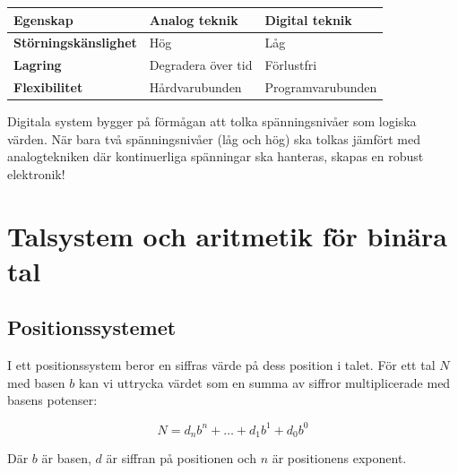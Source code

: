 \documentclass[
  swedish,
  letterpaper,
  oneside,
  openany]{book}
\newcounter{none} %
\begin{document}
{\def\LTcaptype{none} %
\begin{longtable}[]{@{}lll@{}}
\toprule\noalign{}
Egenskap & Analog teknik & Digital teknik \\
\midrule\noalign{}
\endhead
\bottomrule\noalign{}
\endlastfoot
\textbf{Störningskänslighet} & Hög & Låg \\
\textbf{Lagring} & Degradera över tid & Förlustfri \\
\textbf{Flexibilitet} & Hårdvarubunden & Programvarubunden \\
\end{longtable}
}

Digitala system bygger på förmågan att tolka spänningsnivåer som logiska
värden. När bara två spänningsnivåer (låg och hög) ska tolkas jämfört
med analogtekniken där kontinuerliga spänningar ska hanteras, skapas en
robust elektronik!


\chapter{Talsystem och aritmetik för binära
tal}\label{talsystem-och-aritmetik-fuxf6r-binuxe4ra-tal}

\section{Positionssystemet}\label{positionssystemet}

I ett positionssystem beror en siffras värde på dess position i talet.
För ett tal \(N\) med basen \(b\) kan vi uttrycka värdet som en summa av
siffror multiplicerade med basens potenser:

\[N = d_n b^n + \dots + d_1 b^1 + d_0 b^0\]

Där \(b\) är basen, \(d\) är siffran på positionen och \(n\) är
positionens exponent.
\end{document}

